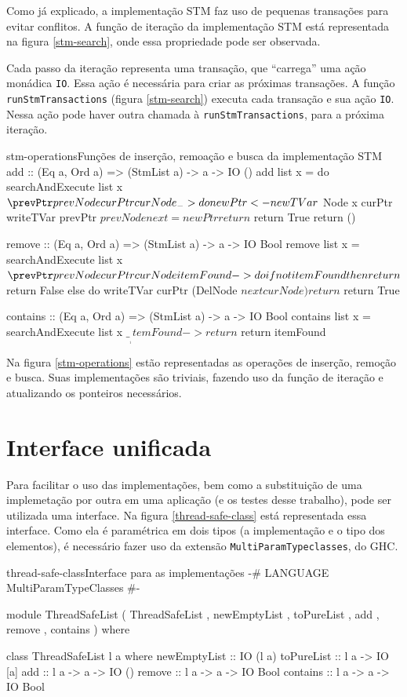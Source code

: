 \documentclass[a4paper,12pt,oldfontcommands]{abntex2}
\begin{document}
Como já explicado, a implementação STM faz uso de pequenas transações para evitar conflitos. A função de iteração da implementação STM está representada na figura \ref{stm-search}, onde essa propriedade pode ser observada.

Cada passo da iteração representa uma transação, que ``carrega'' uma ação monádica \texttt{IO}. Essa ação é necessária para criar as próximas transações. A função \texttt{runStmTransactions} (figura \ref{stm-search}) executa cada transação e sua ação \texttt{IO}. Nessa ação pode haver outra chamada à \texttt{runStmTransactions}, para a próxima iteração.

\begin{code}{stm-operations}{Funções de inserção, remoação e busca da implementação STM}
add :: (Eq a, Ord a) => (StmList a) -> a -> IO ()
add list x = do
    searchAndExecute list x $ \prevPtr prevNode curPtr curNode _ -> do
        newPtr <- newTVar $ Node x curPtr
        writeTVar prevPtr $ prevNode { next = newPtr }
        return $ return True
    return ()

remove :: (Eq a, Ord a) => (StmList a) -> a -> IO Bool
remove list x = searchAndExecute list x $ \prevPtr prevNode curPtr curNode itemFound -> do
    if not itemFound then return $ return False
    else do
        writeTVar curPtr (DelNode $ next curNode)
        return $ return True

contains :: (Eq a, Ord a) => (StmList a) -> a -> IO Bool
contains list x = searchAndExecute list x $ \_ _ _ _ itemFound -> return $ return itemFound
\end{code}

Na figura \ref{stm-operations} estão representadas as operações de inserção, remoção e busca. Suas implementações são triviais, fazendo uso da função de iteração e atualizando os ponteiros necessários.

\section{Interface unificada}

Para facilitar o uso das implementações, bem como a substituição de uma implemetação por outra em uma aplicação (e os testes desse trabalho), pode ser utilizada uma interface. Na figura \ref{thread-safe-class} está representada essa interface. Como ela é paramétrica em dois tipos (a implementação e o tipo dos elementos), é necessário fazer uso da extensão \texttt{MultiParamTypeclasses}, do GHC.

\begin{code}{thread-safe-class}{Interface para as implementações}
{-# LANGUAGE MultiParamTypeClasses #-}

module ThreadSafeList
    ( ThreadSafeList
    , newEmptyList
    , toPureList
    , add
    , remove
    , contains
    ) where

class ThreadSafeList l a where
    newEmptyList :: IO (l a)
    toPureList :: l a -> IO [a]
    add :: l a -> a -> IO ()
    remove :: l a -> a -> IO Bool
    contains :: l a -> a -> IO Bool
\end{code}
\end{document}
